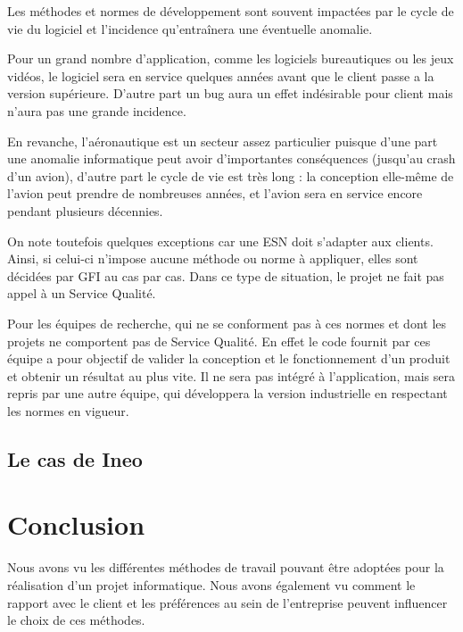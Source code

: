 Les méthodes et normes de développement sont souvent impactées par le cycle de vie du logiciel et l'incidence qu'entraînera une éventuelle anomalie.

Pour un grand nombre d'application, comme les logiciels bureautiques ou les jeux vidéos, le logiciel sera en service quelques années avant que le client passe a la version supérieure. D'autre part un bug aura un effet indésirable pour client mais n'aura pas une grande incidence.

En revanche, l'aéronautique est un secteur assez particulier puisque d'une part une anomalie informatique peut avoir d'importantes conséquences (jusqu'au crash d'un avion), d'autre part le cycle de vie est très long : la conception elle-même de l'avion peut prendre de nombreuses années, et l'avion sera en service encore pendant plusieurs décennies.

On note toutefois quelques exceptions car une \gls{ESN} doit s'adapter aux clients. Ainsi, si celui-ci n'impose aucune méthode ou norme à appliquer, elles sont décidées par GFI au cas par cas. Dans ce type de situation, le projet ne fait pas appel à un Service Qualité.

Pour les équipes de recherche, qui ne se conforment pas à ces normes et dont les projets ne comportent pas de Service Qualité. En effet le code fournit par ces équipe a pour objectif de valider la conception et le fonctionnement d'un produit et obtenir un résultat au plus vite. Il ne sera pas intégré à l'application, mais sera repris par une autre équipe, qui développera la version industrielle en respectant les normes en vigueur.

\subsection{Le cas de Ineo}

\section{Conclusion}

Nous avons vu les différentes méthodes de travail pouvant être adoptées pour la réalisation d'un projet informatique. Nous avons également vu comment le rapport avec le client et les préférences au sein de l'entreprise peuvent influencer le choix de ces méthodes.

